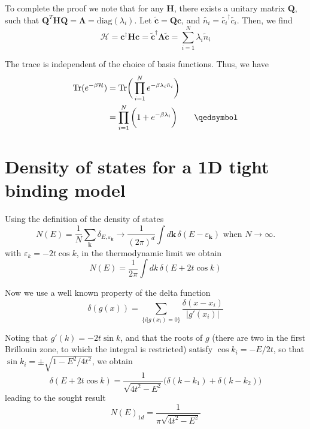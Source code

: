 To complete the proof we note that for any $\bm H$, there exists a unitary matrix $\bm Q$, such that $\bm Q^T \bm H \bm Q = \bm \Lambda = \text{diag}(\lambda_{i})$. Let $\tilde{\bm c} = \bm Q \bm c$, and $\tilde{n_i} = \tilde{c_i}^\dagger \tilde{c_i}$. Then, we find
\begin{equation*}
\mathcal{H} = \bm c^\dagger \bm H \bm c = \bm \tilde{\bm c}^\dagger \bm \Lambda \tilde{\bm c} = \sum_{i=1}^N \lambda_{i} \tilde{n}_{i}
\end{equation*}

The trace is independent of the choice of basis functions. Thus, we have
\begin{equation*}
\begin{split}
\text{Tr} ( e^{-\beta \mathcal{H} } ) &= \text{Tr} \bigg( \prod_{i=1}^N e^{-\beta \lambda_{i} \tilde{n}_{i} } \bigg) \\
&= \prod_{i=1}^N \bigg( 1 + e^{-\beta \lambda_{i} } \bigg) \quad\quad \qedsymbol
\end{split}
\end{equation*}

\section{Density of states for a 1D tight binding model}
\label{sec:dos1d}

Using the definition of the density of states
\begin{equation}
N ( E ) = \frac{1}{N} \sum_{\bm k} \delta_{E,\varepsilon_{\bm k}} \rightarrow \frac{1}{(2\pi)^d} \int d\bm k \, \delta ( E - \varepsilon_{\bm k})\,\, \text{when}\,\, N\rightarrow \infty.
\end{equation}
with $\varepsilon_k = - 2 t \cos k$, in the thermodynamic limit we obtain
\begin{equation}
N ( E ) = \frac{1}{2\pi} \int d k \, \delta ( E + 2t \cos k)
\end{equation}

Now we use a well known property of the delta function
\begin{equation}
\delta ( g(x) ) = \sum_{ \{i | g(x_i) = 0\} } \frac{\delta ( x - x_i) }{| g' ( x_i) |}
\end{equation}

Noting that $g'(k) = - 2 t \sin k$, and that the roots of $g$ (there are two in the first Brillouin zone, to which the integral is restricted) satisfy $\cos k_i = - E / 2t$, so that $\sin k_i = \pm \sqrt{1 - E^2 / 4 t^2}$, we obtain
\begin{equation}
\delta ( E + 2 t \cos k) = \frac{1 }{ \sqrt{4t^2 - E^2 }} \bigg( \delta ( k - k_1 ) + \delta ( k - k_2 ) \bigg)
\end{equation}
leading to the sought result
\begin{equation}
N ( E )_{1d} = \frac{1}{\pi \sqrt{4 t^2 - E^2}}
\end{equation}

